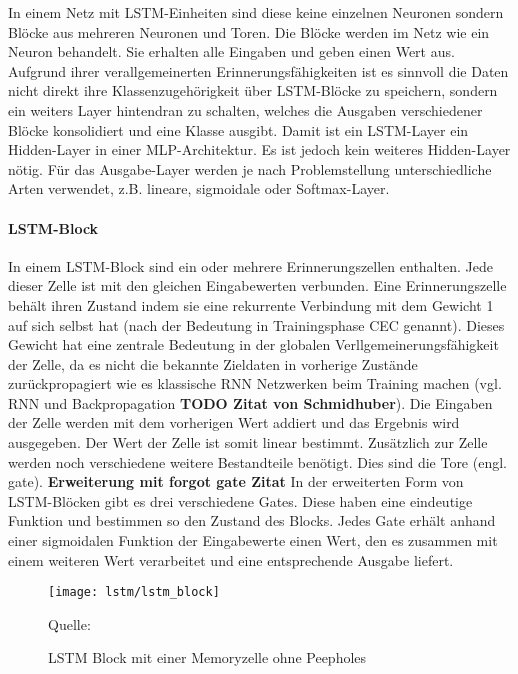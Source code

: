 In einem Netz mit \ac{LSTM}-Einheiten sind diese keine einzelnen
Neuronen sondern Blöcke aus mehreren Neuronen und Toren. Die Blöcke werden im
Netz wie ein Neuron behandelt. Sie erhalten alle Eingaben und geben einen Wert
aus. Aufgrund ihrer verallgemeinerten Erinnerungsfähigkeiten ist es sinnvoll die
Daten nicht direkt ihre Klassenzugehörigkeit über \ac{LSTM}-Blöcke zu speichern,
sondern ein weiters Layer hintendran zu schalten, welches die Ausgaben
verschiedener Blöcke konsolidiert und eine Klasse ausgibt. Damit ist ein
\ac{LSTM}-Layer ein Hidden-Layer in einer \ac{MLP}-Architektur. Es ist jedoch
kein weiteres Hidden-Layer nötig. Für das Ausgabe-Layer werden je nach
Problemstellung unterschiedliche Arten verwendet, z.B. lineare, sigmoidale oder
Softmax-Layer.

\paragraph{\ac{LSTM}-Block}
In einem \ac{LSTM}-Block sind ein oder mehrere Erinnerungszellen enthalten. Jede
dieser Zelle ist mit den gleichen Eingabewerten verbunden. Eine Erinnerungszelle
behält ihren Zustand indem sie eine rekurrente Verbindung mit dem Gewicht 1 auf
sich selbst hat (nach der Bedeutung in Trainingsphase \ac{CEC} genannt).
Dieses Gewicht hat eine zentrale Bedeutung in der globalen Verllgemeinerungsfähigkeit der Zelle, da es nicht die bekannte Zieldaten in
vorherige Zustände zurückpropagiert wie es klassische \ac{RNN} Netzwerken beim
Training machen (vgl. \ac{RNN} und Backpropagation \textbf{TODO Zitat von
Schmidhuber}). Die Eingaben der Zelle werden mit dem vorherigen Wert addiert und
das Ergebnis wird ausgegeben. Der Wert der Zelle ist somit linear bestimmt. 
Zusätzlich zur Zelle werden noch verschiedene weitere Bestandteile benötigt. Dies sind die Tore (engl. gate).
\textbf{Erweiterung mit forgot gate Zitat} In der erweiterten Form von
\ac{LSTM}-Blöcken gibt es drei verschiedene Gates.
Diese haben eine eindeutige Funktion und bestimmen so den Zustand des Blocks.
Jedes Gate erhält anhand einer sigmoidalen Funktion der Eingabewerte einen Wert,
den es zusammen mit einem weiteren Wert verarbeitet und eine entsprechende
Ausgabe liefert.

\begin{figure}[htfp]
	\begin{center}
	\texttt{[image: lstm/lstm\_block]}
	\caption[\acs{LSTM} Block]{\acs{LSTM} Block mit einer Memoryzelle ohne
	Peepholes} \tiny Quelle: \cite{WIKI2013}
	\label{fig:lstm_block}
	\end{center}
\end{figure} 

